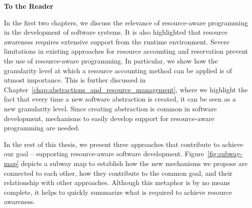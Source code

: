 \thispagestyle{plain}
\noindent\makebox[\linewidth]{\rule{\textwidth}{2pt}}

\vspace{0.4cm}
{\huge \textbf{To the Reader}}
\vspace{0.2cm}

\noindent\makebox[\linewidth]{\rule{\textwidth}{2pt}}

\newcommand{\placelast}{west}
\newcommand{\placelastt}{south}
\newcommand{\placelasttt}{north}

In the first two chapters, we discuss the relevance of resource-aware programming in the development of software systems.
It is also highlighted that resource awareness requires extensive support from the runtime environment.
Severe limitations in existing approaches for resource accounting and reservation prevent the use of resource-aware programming.
In particular, we show how the granularity level at which a resource accounting method can be applied is of utmost importance. %
This is further discussed in Chapter~\ref{chap:abstractions_and_resource_management}, where we highlight the fact that every time a new software abstraction is created, it can be seen as a new granularity level.
Since creating abstraction is common in software development, mechanisms to easily develop support for resource-aware programming are needed. 

In the rest of this thesis, we present three approaches that contribute to achieve our goal -- supporting resource-aware software development.
Figure~\ref{fig:subway-map} depicts a subway map to establish how the new mechanisms we propose are connected to each other, how they contribute to the common goal, and their relationship with other approaches.
Although this metaphor is by no means complete, it helps to quickly summarize what is required to achieve resource awareness. 

